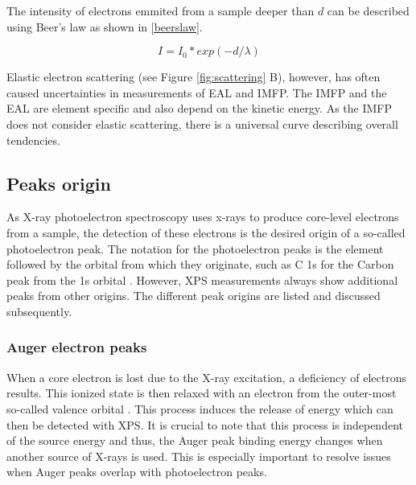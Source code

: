 The intensity of electrons emmited from a sample deeper than $d$ can be described using Beer's law as shown in \ref{beerslaw}.

\begin{equation}
\label{beerslaw}
    I = I_{0} * exp(-d/\lambda)
\end{equation}

Elastic electron scattering (see Figure \ref{fig:scattering} B), however, has often caused uncertainties in measurements of EAL and IMFP. 
The IMFP and the EAL are element specific and also depend on the kinetic energy. As the IMFP does not consider elastic scattering, there is a universal curve describing overall tendencies.

\subsection{Peaks origin} %

As X-ray photoelectron spectroscopy uses x-rays to produce core-level electrons from a sample, the detection of these electrons is the desired origin of a so-called photoelectron peak. The notation for the photoelectron peaks is the element followed by the orbital from which they originate, such as C 1s for the Carbon peak from the 1s orbital \cite{stevie_introduction_2020}.
However, XPS measurements always show additional peaks from other origins. The different peak origins are listed and discussed subsequently.

\subsubsection{Auger electron peaks}

When a core electron is lost due to the X-ray excitation, a deficiency of electrons results. This ionized state is then relaxed with an electron from the outer-most so-called valence orbital \cite{stevie_introduction_2020}. This process induces the release of energy which can then be detected with XPS. It is crucial to note that this process is independent of the source energy and thus, the Auger peak binding energy changes when another source of X-rays is used. This is especially important to resolve issues when Auger peaks overlap with photoelectron peaks. 

